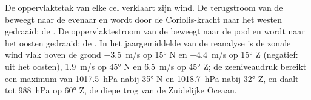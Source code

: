 De oppervlaktetak van elke cel verklaart zijn wind. De terugstroom van de  beweegt naar de evenaar en wordt door de Coriolis-kracht naar het westen gedraaid: de . De oppervlaktestroom van de  beweegt naar de pool en wordt naar het oosten gedraaid: de . In het jaargemiddelde van de reanalyse is de zonale wind vlak boven de grond \qty{-3.5}{m/s} op \ang{15} N en \qty{-4.4}{m/s} op \ang{15} Z (negatief: uit het oosten), \qty{+1.9}{m/s} op \ang{45} N en \qty{+6.5}{m/s} op \ang{45} Z; de zeeniveaudruk bereikt een maximum van \qty{1017.5}{hPa} nabij \ang{35} N en \qty{1018.7}{hPa} nabij \ang{32} Z, en daalt tot \qty{988}{hPa} op \ang{60} Z, de diepe trog van de Zuidelijke Oceaan.

